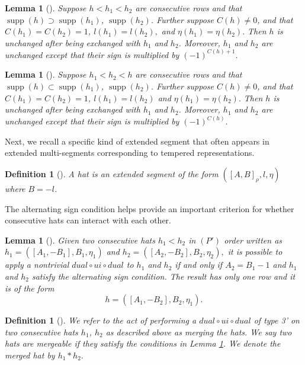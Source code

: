 \documentclass[11pt,letterpaper]{amsart}
\newtheorem{lemma}[thm]{Lemma}
\newtheorem{defn}[thm]{Definition}
\DeclareMathOperator{\supp}{supp}
\numberwithin{equation}{section}
\begin{document}
\begin{lemma}[{\cite[Lemma 4.17]{HKT26}}]
\label{lem-multiplicity-cancel}
    Suppose $h < h_1 < h_2$ are consecutive rows and that $\supp(h) \supset \supp(h_1)$, $\supp(h_2)$. Further suppose $C(h) \neq 0$, and that $C(h_1) = C(h_2) = 1$, $l(h_1) = l(h_2),$ and $\eta(h_1) = \eta(h_2).$ Then $h$ is unchanged after being exchanged with $h_1$ and $h_2$. Moreover, $h_1$ and $h_2$ are unchanged except that their sign is multiplied by $(-1)^{C(h) + 1}$.
\end{lemma}

\begin{lemma}[{\cite[Lemma 4.18]{HKT26}}]
\label{lem-multiplicity-cancel-up}
    Suppose $h_1 < h_2 < h$ are consecutive rows and that $\supp(h) \subset \supp(h_1)$, $\supp(h_2)$. Further suppose $C(h) \neq 0$, and that $C(h_1) = C(h_2) = 1$, $l(h_1) = l(h_2)$ and $\eta(h_1) = \eta(h_2).$ Then $h$ is unchanged after being exchanged with $h_1$ and $h_2$. Moreover, $h_1$ and $h_2$ are unchanged except that their sign is multiplied by $(-1)^{C(h)}$.
\end{lemma}

Next, we recall a specific kind of extended segment that often appears in extended multi-segments corresponding to tempered representations.

\begin{defn}[{\cite[Definition 4.12]{HKT26}}]
\label{def-hat}
    A \emph{hat} is an extended segment of the form $([A, B]_\rho, l, \eta)$ where $B = -l$.
\end{defn}


The alternating sign condition helps provide an important criterion for whether consecutive hats can interact with each other.

\begin{lemma}[{\cite[Lemma 4.19]{HKT26}}]
\label{merge}
    Given two consecutive hats $h_1 < h_2$ in $(P')$ order written as $h_1 = ([A_1, -B_1], B_1, \eta_1)$ and $h_2 = ([A_2, -B_2], B_2, \eta_2),$
    it is possible to apply a nontrivial $dual \circ ui \circ dual$ to $h_1$ and $h_2$ if and only if $A_2 = B_1 - 1$ and $h_1$ and $h_2$ satisfy the alternating sign condition.
    The result has only one row and it is of the form \[h = ([A_1, -B_2], B_2, \eta_1).\]
\end{lemma}

\begin{defn}[{\cite[Definition 4.20]{HKT26}}]
    We refer to the act of performing a $dual \circ ui \circ dual$ of type 3' on two consecutive hats $h_1$, $h_2$ as described above as \emph{merging} the hats. We say two hats are \emph{mergeable} if they satisfy the conditions in Lemma \ref{merge}. We denote the merged hat by $h_1 * h_2.$
\end{defn}
\end{document}
